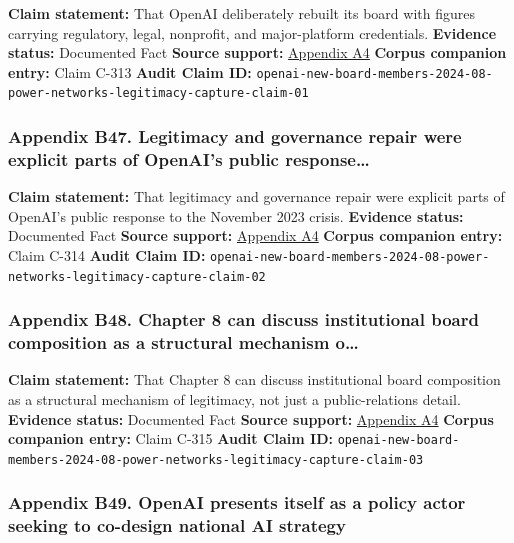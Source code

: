 \documentclass[
  american,
  11pt,
  letterpaper,
]{article}
\begin{document}
\textbf{Claim statement:} That OpenAI deliberately rebuilt its board
with figures carrying regulatory, legal, nonprofit, and major-platform
credentials. \textbf{Evidence status:} Documented Fact \textbf{Source
support:}
\hyperref[ch-08-appendix-a4-openai-announces-new-members-to-board-of-directors]{Appendix
A4} \textbf{Corpus companion entry:} Claim C-313 \textbf{Audit Claim
ID:}
\texttt{openai-new-board-members-2024-08-power-networks-legitimacy-capture-claim-01}

\subsubsection{Appendix B47. Legitimacy and governance repair were
explicit parts of OpenAI's public
response\ldots{}}\label{ch-08-appendix-b47-legitimacy-and-governance-repair-were-explicit-parts-of-openai-s-public-response}

\textbf{Claim statement:} That legitimacy and governance repair were
explicit parts of OpenAI's public response to the November 2023 crisis.
\textbf{Evidence status:} Documented Fact \textbf{Source support:}
\hyperref[ch-08-appendix-a4-openai-announces-new-members-to-board-of-directors]{Appendix
A4} \textbf{Corpus companion entry:} Claim C-314 \textbf{Audit Claim
ID:}
\texttt{openai-new-board-members-2024-08-power-networks-legitimacy-capture-claim-02}

\subsubsection{Appendix B48. Chapter 8 can discuss institutional board
composition as a structural mechanism
o\ldots{}}\label{ch-08-appendix-b48-chapter-8-can-discuss-institutional-board-composition-as-a-structural-mechanism-o}

\textbf{Claim statement:} That Chapter 8 can discuss institutional board
composition as a structural mechanism of legitimacy, not just a
public-relations detail. \textbf{Evidence status:} Documented Fact
\textbf{Source support:}
\hyperref[ch-08-appendix-a4-openai-announces-new-members-to-board-of-directors]{Appendix
A4} \textbf{Corpus companion entry:} Claim C-315 \textbf{Audit Claim
ID:}
\texttt{openai-new-board-members-2024-08-power-networks-legitimacy-capture-claim-03}

\subsubsection{Appendix B49. OpenAI presents itself as a policy actor
seeking to co-design national AI
strategy}\label{ch-08-appendix-b49-openai-presents-itself-as-a-policy-actor-seeking-to-co-design-national-ai-strategy}
\end{document}
